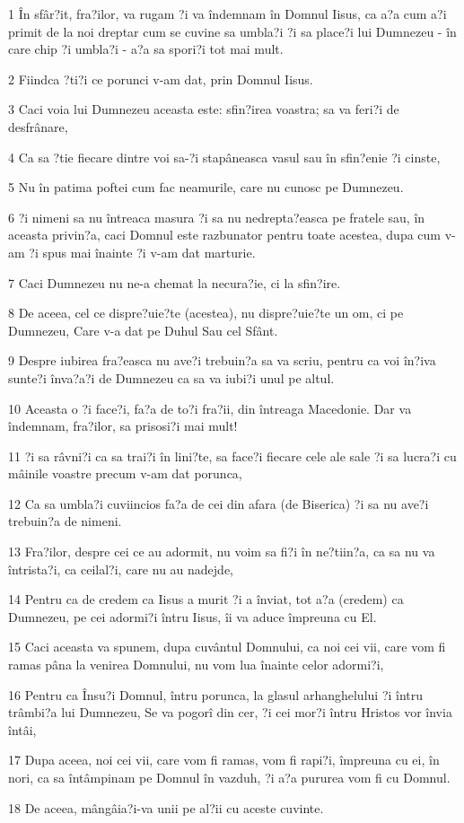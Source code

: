 \par 1 În sfâr?it, fra?ilor, va rugam ?i va îndemnam în Domnul Iisus, ca a?a cum a?i primit de la noi dreptar cum se cuvine sa umbla?i ?i sa place?i lui Dumnezeu - în care chip ?i umbla?i - a?a sa spori?i tot mai mult.
\par 2 Fiindca ?ti?i ce porunci v-am dat, prin Domnul Iisus.
\par 3 Caci voia lui Dumnezeu aceasta este: sfin?irea voastra; sa va feri?i de desfrânare,
\par 4 Ca sa ?tie fiecare dintre voi sa-?i stapâneasca vasul sau în sfin?enie ?i cinste,
\par 5 Nu în patima poftei cum fac neamurile, care nu cunosc pe Dumnezeu.
\par 6 ?i nimeni sa nu întreaca masura ?i sa nu nedrepta?easca pe fratele sau, în aceasta privin?a, caci Domnul este razbunator pentru toate acestea, dupa cum v-am ?i spus mai înainte ?i v-am dat marturie.
\par 7 Caci Dumnezeu nu ne-a chemat la necura?ie, ci la sfin?ire.
\par 8 De aceea, cel ce dispre?uie?te (acestea), nu dispre?uie?te un om, ci pe Dumnezeu, Care v-a dat pe Duhul Sau cel Sfânt.
\par 9 Despre iubirea fra?easca nu ave?i trebuin?a sa va scriu, pentru ca voi în?iva sunte?i înva?a?i de Dumnezeu ca sa va iubi?i unul pe altul.
\par 10 Aceasta o ?i face?i, fa?a de to?i fra?ii, din întreaga Macedonie. Dar va îndemnam, fra?ilor, sa prisosi?i mai mult!
\par 11 ?i sa râvni?i ca sa trai?i în lini?te, sa face?i fiecare cele ale sale ?i sa lucra?i cu mâinile voastre precum v-am dat porunca,
\par 12 Ca sa umbla?i cuviincios fa?a de cei din afara (de Biserica) ?i sa nu ave?i trebuin?a de nimeni.
\par 13 Fra?ilor, despre cei ce au adormit, nu voim sa fi?i în ne?tiin?a, ca sa nu va întrista?i, ca ceilal?i, care nu au nadejde,
\par 14 Pentru ca de credem ca Iisus a murit ?i a înviat, tot a?a (credem) ca Dumnezeu, pe cei adormi?i întru Iisus, îi va aduce împreuna cu El.
\par 15 Caci aceasta va spunem, dupa cuvântul Domnului, ca noi cei vii, care vom fi ramas pâna la venirea Domnului, nu vom lua înainte celor adormi?i,
\par 16 Pentru ca Însu?i Domnul, întru porunca, la glasul arhanghelului ?i întru trâmbi?a lui Dumnezeu, Se va pogorî din cer, ?i cei mor?i întru Hristos vor învia întâi,
\par 17 Dupa aceea, noi cei vii, care vom fi ramas, vom fi rapi?i, împreuna cu ei, în nori, ca sa întâmpinam pe Domnul în vazduh, ?i a?a pururea vom fi cu Domnul.
\par 18 De aceea, mângâia?i-va unii pe al?ii cu aceste cuvinte.

